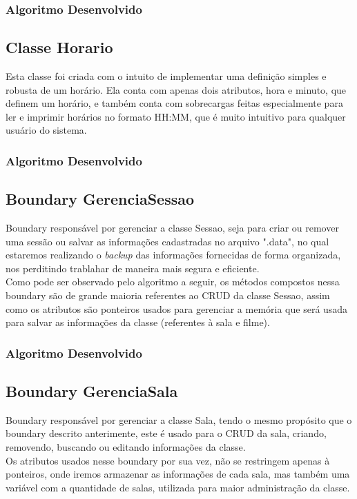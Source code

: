 \documentclass[a4paper]{article}
\begin{document}
\subsubsection{Algoritmo Desenvolvido}


\pagebreak

\subsection{Classe Horario}
\hspace{5 mm}Esta classe foi criada com o intuito de implementar uma definição simples e robusta de um horário. Ela conta com apenas dois atributos, hora e minuto, que definem um horário, e também conta com sobrecargas feitas especialmente para ler e imprimir horários no formato HH:MM, que é muito intuitivo para qualquer usuário do sistema.

\subsubsection{Algoritmo Desenvolvido}


\pagebreak

\subsection{Boundary GerenciaSessao}
\hspace{5 mm}Boundary responsável por gerenciar a classe Sessao, seja para criar ou remover uma sessão ou salvar as informações cadastradas no arquivo ".data", no qual estaremos realizando o \textit{backup} das informações fornecidas de forma organizada, nos perditindo trablahar de maneira mais segura e eficiente.\\
\quad{\null}\hspace{5 mm}Como pode ser observado pelo algoritmo a seguir, os métodos compostos nessa boundary são de grande maioria referentes ao CRUD da classe Sessao, assim como os atributos são ponteiros usados para gerenciar a memória que será usada para salvar as informações da classe (referentes à sala e filme).
\subsubsection{Algoritmo Desenvolvido}


\pagebreak

\subsection{Boundary GerenciaSala}
\hspace{5 mm}Boundary responsável por gerenciar a classe Sala, tendo o mesmo propósito que o boundary descrito anterimente, este é usado para o CRUD da sala, criando, removendo, buscando ou editando informações da classe.\\
\quad{\null}\hspace{5 mm}Os atributos usados nesse boundary por sua vez, não se restringem apenas à ponteiros, onde iremos armazenar as informações de cada sala, mas também uma variável com a quantidade de salas, utilizada para maior administração da classe.
\end{document}
